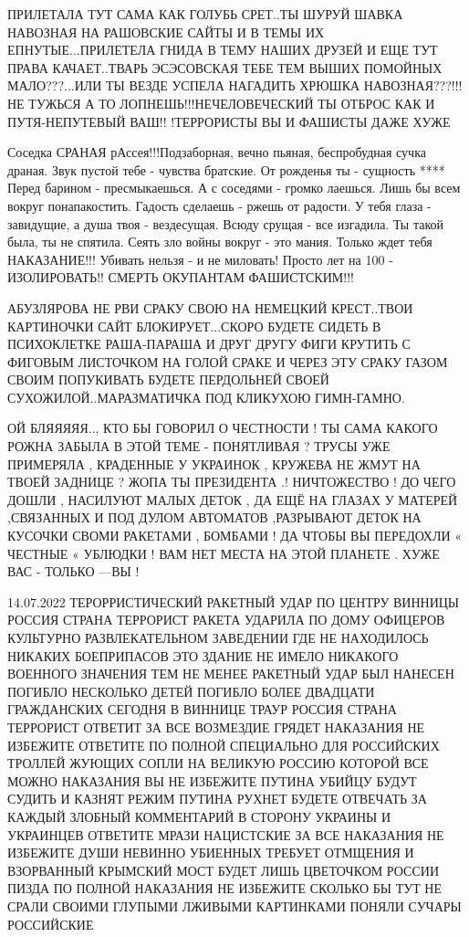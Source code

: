 ПРИЛЕТАЛА ТУТ САМА КАК ГОЛУБЬ СРЕТ..ТЫ ШУРУЙ ШАВКА НАВОЗНАЯ НА РАШОВСКИЕ САЙТЫ
И В ТЕМЫ ИХ ЕПНУТЫЕ...ПРИЛЕТЕЛА ГНИДА В ТЕМУ НАШИХ ДРУЗЕЙ И ЕЩЕ ТУТ ПРАВА
КАЧАЕТ..ТВАРЬ ЭСЭСОВСКАЯ ТЕБЕ ТЕМ ВЫШИХ ПОМОЙНЫХ МАЛО???...ИЛИ ТЫ ВЕЗДЕ УСПЕЛА
НАГАДИТЬ ХРЮШКА НАВОЗНАЯ???!!!НЕ ТУЖЬСЯ А ТО ЛОПНЕШЬ!!!НЕЧЕЛОВЕЧЕСКИЙ ТЫ ОТБРОС
КАК И ПУТЯ-НЕПУТЕВЫЙ ВАШ!! !ТЕРРОРИСТЫ ВЫ И ФАШИСТЫ ДАЖЕ ХУЖЕ                                                             

Соседка СРАНАЯ рАссея!!!Подзаборная, вечно пьяная, беспробудная сучка драная.
Звук пустой тебе - чувства братские. От рожденья ты - сущность **** Перед
барином - пресмыкаешься. А с соседями - громко лаешься. Лишь бы всем вокруг
понапакостить. Гадость сделаешь - ржешь от радости. У тебя глаза - завидущие, а
душа твоя - вездесущая. Всюду срущая - все изгадила. Ты такой была, ты не
спятила. Сеять зло войны вокруг - это мания. Только ждет тебя НАКАЗАНИЕ!!!
Убивать нельзя - и не миловать! Просто лет на 100 - ИЗОЛИРОВАТЬ!! СМЕРТЬ
ОКУПАНТАМ ФАШИСТСКИМ!!!

АБУЗЛЯРОВА НЕ РВИ СРАКУ СВОЮ НА НЕМЕЦКИЙ КРЕСТ..ТВОИ КАРТИНОЧКИ САЙТ
БЛОКИРУЕТ...СКОРО БУДЕТЕ СИДЕТЬ В ПСИХОКЛЕТКЕ РАША-ПАРАША И ДРУГ ДРУГУ ФИГИ
КРУТИТЬ С ФИГОВЫМ ЛИСТОЧКОМ НА  ГОЛОЙ СРАКЕ И ЧЕРЕЗ ЭТУ СРАКУ ГАЗОМ СВОИМ
ПОПУКИВАТЬ БУДЕТЕ ПЕРДОЛЬНЕЙ СВОЕЙ СУХОЖИЛОЙ..МАРАЗМАТИЧКА ПОД КЛИКУХОЮ
ГИМН-ГАМНО.

ОЙ БЛЯЯЯЯЯ.., КТО БЫ ГОВОРИЛ О ЧЕСТНОСТИ ! ТЫ САМА КАКОГО РОЖНА ЗАБЫЛА В ЭТОЙ
ТЕМЕ - ПОНЯТЛИВАЯ ? ТРУСЫ УЖЕ ПРИМЕРЯЛА , КРАДЕННЫЕ У УКРАИНОК , КРУЖЕВА НЕ
ЖМУТ НА ТВОЕЙ ЗАДНИЦЕ ? ЖОПА ТЫ ПРЕЗИДЕНТА .! НИЧТОЖЕСТВО ! ДО ЧЕГО ДОШЛИ ,
НАСИЛУЮТ МАЛЫХ ДЕТОК , ДА ЕЩЁ НА ГЛАЗАХ У МАТЕРЕЙ ,СВЯЗАННЫХ И ПОД ДУЛОМ
АВТОМАТОВ ,РАЗРЫВАЮТ ДЕТОК НА КУСОЧКИ СВОМИ РАКЕТАМИ , БОМБАМИ ! ДА ЧТОБЫ ВЫ
ПЕРЕДОХЛИ « ЧЕСТНЫЕ « УБЛЮДКИ ! ВАМ НЕТ МЕСТА НА ЭТОЙ ПЛАНЕТЕ . ХУЖЕ ВАС -
ТОЛЬКО —ВЫ !

14.07.2022
ТЕРОРРИСТИЧЕСКИЙ РАКЕТНЫЙ УДАР ПО ЦЕНТРУ ВИННИЦЫ РОССИЯ СТРАНА ТЕРРОРИСТ РАКЕТА
УДАРИЛА ПО ДОМУ ОФИЦЕРОВ КУЛЬТУРНО РАЗВЛЕКАТЕЛЬНОМ ЗАВЕДЕНИИ ГДЕ НЕ НАХОДИЛОСЬ
НИКАКИХ БОЕПРИПАСОВ ЭТО ЗДАНИЕ НЕ ИМЕЛО НИКАКОГО ВОЕННОГО ЗНАЧЕНИЯ ТЕМ НЕ МЕНЕЕ
РАКЕТНЫЙ УДАР БЫЛ НАНЕСЕН ПОГИБЛО НЕСКОЛЬКО ДЕТЕЙ ПОГИБЛО БОЛЕЕ ДВАДЦАТИ
ГРАЖДАНСКИХ СЕГОДНЯ В ВИННИЦЕ ТРАУР РОССИЯ СТРАНА ТЕРРОРИСТ ОТВЕТИТ ЗА ВСЕ
ВОЗМЕЗДИЕ ГРЯДЕТ НАКАЗАНИЯ НЕ ИЗБЕЖИТЕ ОТВЕТИТЕ ПО ПОЛНОЙ СПЕЦИАЛЬНО ДЛЯ
РОССИЙСКИХ ТРОЛЛЕЙ ЖУЮЩИХ СОПЛИ НА ВЕЛИКУЮ РОССИЮ КОТОРОЙ ВСЕ МОЖНО НАКАЗАНИЯ
ВЫ НЕ ИЗБЕЖИТЕ ПУТИНА УБИЙЦУ БУДУТ СУДИТЬ И КАЗНЯТ РЕЖИМ ПУТИНА РУХНЕТ БУДЕТЕ
ОТВЕЧАТЬ ЗА КАЖДЫЙ ЗЛОБНЫЙ КОММЕНТАРИЙ В СТОРОНУ УКРАИНЫ И УКРАИНЦЕВ ОТВЕТИТЕ
МРАЗИ НАЦИСТСКИЕ ЗА ВСЕ НАКАЗАНИЯ НЕ ИЗБЕЖИТЕ ДУШИ НЕВИННО УБИЕННЫХ ТРЕБУЕТ
ОТМЩЕНИЯ И ВЗОРВАННЫЙ КРЫМСКИЙ МОСТ БУДЕТ ЛИШЬ ЦВЕТОЧКОМ РОССИИ ПИЗДА ПО ПОЛНОЙ
НАКАЗАНИЯ НЕ ИЗБЕЖИТЕ СКОЛЬКО БЫ ТУТ НЕ СРАЛИ СВОИМИ ГЛУПЫМИ ЛЖИВЫМИ КАРТИНКАМИ
ПОНЯЛИ СУЧАРЫ РОССИЙСКИЕ

